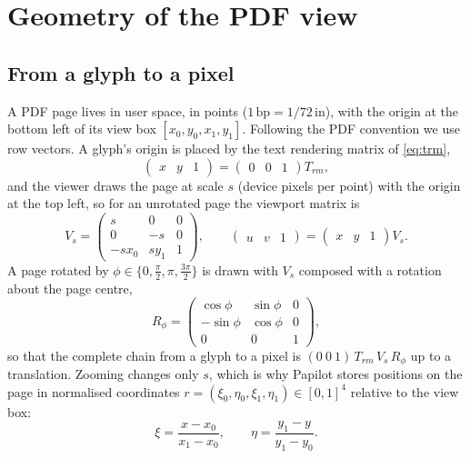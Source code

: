 \section{Geometry of the PDF view}
\label{sec:geometry}

\subsection{From a glyph to a pixel}

A PDF page lives in user space, in points ($1\,\mathrm{bp} = 1/72$\,in), with
the origin at the bottom left of its view box $[x_0, y_0, x_1, y_1]$. Following
the PDF convention we use row vectors. A glyph's origin is placed by the text
rendering matrix of \cref{eq:trm},
\begin{equation}
  \begin{pmatrix} x & y & 1 \end{pmatrix}
  = \begin{pmatrix} 0 & 0 & 1 \end{pmatrix} T_{rm} ,
\end{equation}
and the viewer draws the page at scale $s$ (device pixels per point) with the
origin at the top left, so for an unrotated page the viewport matrix is
\begin{equation}
  V_s =
  \begin{pmatrix}
    s & 0 & 0 \\
    0 & -s & 0 \\
    -s x_0 & s y_1 & 1
  \end{pmatrix},
  \qquad
  \begin{pmatrix} u & v & 1 \end{pmatrix}
  = \begin{pmatrix} x & y & 1 \end{pmatrix} V_s .
  \label{eq:viewport}
\end{equation}
A page rotated by $\phi \in \{0, \tfrac{\pi}{2}, \pi, \tfrac{3\pi}{2}\}$ is
drawn with $V_s$ composed with a rotation about the page centre,
\begin{equation}
  R_{\phi} =
  \begin{pmatrix}
    \cos\phi & \sin\phi & 0 \\
    -\sin\phi & \cos\phi & 0 \\
    0 & 0 & 1
  \end{pmatrix},
\end{equation}
so that the complete chain from a glyph to a pixel is
$(0\ 0\ 1)\, T_{rm}\, V_s\, R_{\phi}$ up to a translation. Zooming changes only
$s$, which is why Papilot stores positions on the page in normalised
coordinates $r = (\xi_0, \eta_0, \xi_1, \eta_1) \in [0,1]^4$ relative to the
view box:
\begin{equation}
  \xi = \frac{x - x_0}{x_1 - x_0}, \qquad
  \eta = \frac{y_1 - y}{y_1 - y_0} .
  \label{eq:normalised}
\end{equation}


